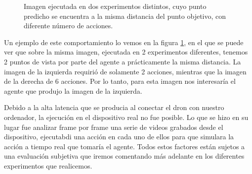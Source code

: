 \begin{figure}[ht!]
	\centering
	\hspace{0.05\textwidth}
	\caption[Imagen ejecutada en dos experimentos distintos, a la misma distancia del punto objetivo, con diferente número de acciones.]{Imagen ejecutada en dos experimentos distintos, cuyo punto predicho se encuentra a la misma distancia del punto objetivo, con diferente número de acciones.}%
	\label{fig-comparacion-numero-de-acciones}
  \end{figure}
\medskip

Un ejemplo de este comportamiento lo vemos en la figura \ref{fig-comparacion-numero-de-acciones}, en el que se puede ver que sobre la misma imagen, ejecutada en 2 experimentos diferentes, tenemos 2 puntos de vista por parte del agente a prácticamente la misma distancia. La imagen de la izquierda requirió de solamente 2 acciones, mientras que la imagen de la derecha de 6 acciones. Por lo tanto, para esta imagen nos interesaría el agente que produjo la imagen de la izquierda.
\medskip

Debido a la alta latencia que se producia al conectar el dron con nuestro ordenador, la ejecución en el dispositivo real no fue posible. Lo que se hizo en su lugar fue analizar frame por frame una serie de videos grabados desde el dispositivo, ejecutabdi una acción en cada uno de ellos para que simulara la acción a tiempo real que tomaría el agente.
Todos estos factores están sujetos a una evaluación subjetiva que iremos comentando más adelante en los diferentes experimentos que realicemos.